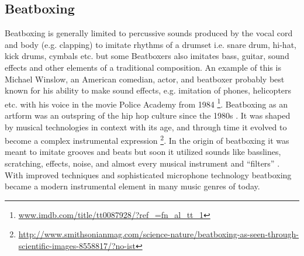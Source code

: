 \subsection{ Beatboxing }
Beatboxing is generally limited to percussive sounds produced by the vocal cord and body (e.g. clapping) to imitate rhythms of a drumset i.e. snare drum, hi-hat, kick drums, cymbals etc. but some Beatboxers also imitates bass, guitar, sound effects and other elements of a traditional composition. An example of this is Michael Winslow, an American comedian, actor, and beatboxer probably best known for his ability to make sound effects, e.g. imitation of phones, helicopters etc. with his voice in the movie Police Academy from 1984 \footnote{\url{www.imdb.com/title/tt0087928/?ref_=fn_al_tt_1}}. Beatboxing as an artform was an outspring of the hip hop culture since the 1980s \citep{Sinyor05}. It was shaped by musical technologies in context with its age, and through time it evolved to become a complex instrumental expression \footnote{\url{http://www.smithsonianmag.com/science-nature/beatboxing-as-seen-through-scientific-images-8558817/?no-ist}}. In the origin of beatboxing it was meant to imitate grooves and beats but soon it utilized sounds like basslines, scratching, effects, noise, and almost every musical instrument and “filters” \citep{proctor2012}. With improved techniques and sophisticated microphone technology beatboxing became a modern instrumental element in many music genres of today.


